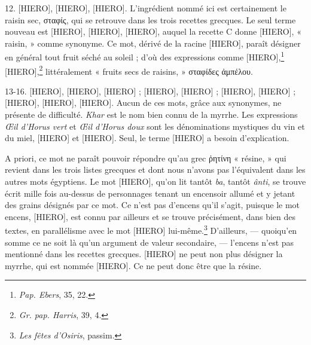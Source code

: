 \documentclass[a4paper, 11pt, oneside]{article}
\begin{document}

12. [HIERO], [HIERO], [HIERO]. L'ingrédient nommé ici est certainement le raisin sec, σταφίς, qui se retrouve dans les trois recettes grecques. Le seul terme nouveau est [HIERO], [HIERO], [HIERO], auquel la recette C donne [HIERO], « raisin, » comme synonyme. Ce mot, dérivé de la racine [HIERO], paraît désigner en général tout fruit séché au soleil ; d'où des expressions comme [HIERO],\footnote{\emph{Pap. Ebers}, 35, 22.} [HIERO],\footnote{\emph{Gr. pap. Harris}, 39, 4.} littéralement « fruits secs de raisins, » σταφίδες ἀμπέλου.

13-16. [HIERO], [HIERO], [HIERO] ; [HIERO], [HIERO] ; [HIERO], [HIERO] ; [HIERO], [HIERO], [HIERO]. Aucun de ces mots, grâce aux synonymes, ne présente de difficulté. \emph{Khar} est le nom bien connu de la myrrhe. Les expressions \emph{Œil d'Horus vert} et \emph{Œil d'Horus doux} sont les dénominations mystiques du vin et du miel, [HIERO] et [HIERO]. Seul, le terme [HIERO] a besoin d'explication.

A priori, ce mot ne paraît pouvoir répondre qu'au grec ῥητίνη « résine, » qui revient dans les trois listes grecques et dont nous n'avons pas l'équivalent dans les autres mots égyptiens. Le mot [HIERO], qu'on lit tantôt \emph{ba}, tantôt \emph{ânti}, se trouve écrit mille fois au-dessus de personnages tenant un encensoir allumé et y jetant des grains désignés par ce mot. Ce n'est pas d'encens qu'il s'agit, puisque le mot encens, [HIERO], est connu par ailleurs et se trouve précisément, dans bien des textes, en parallélisme avec le mot [HIERO] lui-même.\footnote{\emph{Les fêtes d'Osiris}, passim.} D'ailleurs, --- quoiqu'en somme ce ne soit là qu'un argument de valeur secondaire, --- l'encens n'est pas mentionné dans les recettes grecques. [HIERO] ne peut non plus désigner la myrrhe, qui est nommée [HIERO]. Ce ne peut donc être que la résine.
\end{document}
